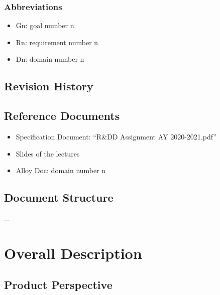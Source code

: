 \documentclass{article}
\begin{document}
		\subsubsection{Abbreviations}
		\begin{itemize}
			\item \textcolor{BrickRed}{Gn}: goal number n
			\item \textcolor{BrickRed}{Rn}: requirement number n
			\item \textcolor{BrickRed}{Dn}: domain number n
		\end{itemize}
		
	\subsection{Revision History}
	\subsection{Reference Documents}
	\begin{itemize}
			\item \textcolor{BrickRed}{Specification Document}: “R\&DD Assignment AY 2020-2021.pdf”
			\item \textcolor{BrickRed}{Slides of the lectures}
			\item \textcolor{BrickRed}{Alloy Doc}: domain number n
	\end{itemize}
	
	\subsection{Document Structure}
	...
	
	\section{Overall Description}
	\subsection{Product Perspective}
\end{document}
